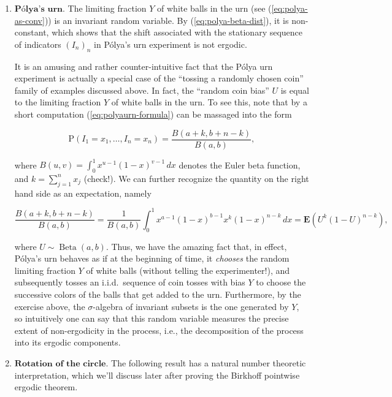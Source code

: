\begin{enumerate}[label=\arabic*.]
\begin{xexercise}
Show that the $\sigma$-algebra $\mathcal{I}$ of
invariant subsets for this process coincides with the
$\sigma$-algebra $\sigma(U)$ generated by the random
coin bias $U$. That means that, not only is $U$ an
invariant random variable, but any other invariant
random variable can be computed once the value of $U$
is known.
\end{xexercise}

\item $\textbf{Pólya's urn.}$ The limiting fraction $Y$ of
white balls in the urn (see (\ref{eq:polya-as-conv})) is
an invariant random variable. By
(\ref{eq:polya-beta-dist}), it is non-constant, which
shows that the shift associated  with the stationary
sequence of indicators $(I_n)_n$ in Pólya's urn
experiment is not ergodic.

It is an amusing and rather counter-intuitive fact
that the Pólya urn experiment is actually a special
case of the ``tossing a randomly chosen coin'' family
of examples discussed above. In fact, the ``random
coin bias'' $U$ is equal to the limiting fraction $Y$
of white balls in the urn. To see this, note that by a
short computation (\ref{eq:polyaurn-formula}) can be
massaged into the form

\[
\mathrm{P}(I_1=x_1, \ldots, I_n=x_n) = \frac{B(a+k, b+n-k)}{B(a,b)},
\]

\noindent where $B(u,v)=\int_0^1 x^{u-1}(1-x)^{v-1}\,dx$
denotes the Euler beta function, and
$k=\sum_{j=1}^n x_j$ (check!). We can further
recognize the quantity on the right hand side as an
expectation, namely

\[
\frac{B(a+k, b+n-k)}{B(a,b)}= \frac{1}{B(a,b)}\int_0^1 x^{a-1}(1-x)^{b-1} x^k(1-x)^{n-k}\,dx = \mathbf{E}(U^k(1-U)^{n-k}),
\]

\noindent where $U\sim \operatorname{Beta}(a,b)$. Thus, we have
the amazing fact that, in effect, Pólya's urn behaves
as if at the beginning of time, it \emph{chooses} the
random limiting fraction $Y$ of white balls (without
telling the experimenter!), and subsequently tosses an
i.i.d.\ sequence of coin tosses with bias $Y$ to
choose the successive colors of the balls that get
added to the urn. Furthermore, by the exercise above,
the $\sigma$-algebra of invariant subsets is the one
generated by $Y$, so intuitively one can say that
this random variable measures the precise extent of
non-ergodicity in the process, i.e., the decomposition
of the process into its ergodic components.

\item $\textbf{Rotation of the circle.}$ The following
result has a natural number theoretic interpretation,
which we'll discuss later after proving the Birkhoff
pointwise ergodic theorem.


\end{enumerate}
